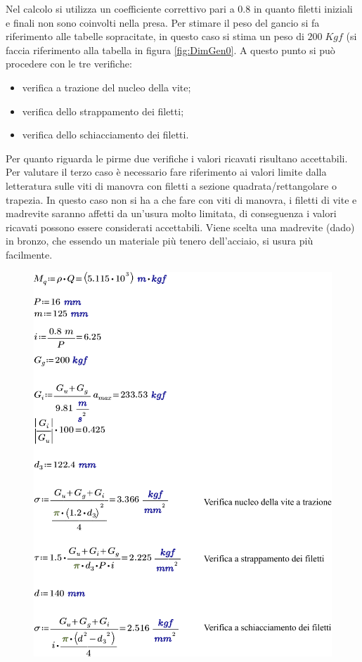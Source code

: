 Nel calcolo si utilizza un coefficiente correttivo pari a $0.8$ in quanto filetti iniziali e finali non sono coinvolti nella presa. 
Per stimare il peso del gancio si fa riferimento alle tabelle sopracitate, in questo caso si stima un peso di $200\; Kgf$ (si faccia riferimento alla tabella in figura \ref{fig:DimGen0}. 
A questo punto si può procedere con le tre verifiche:
\begin{itemize}
\item verifica a trazione del nucleo della vite;
\item verifica dello strappamento dei filetti;
\item verifica dello schiacciamento dei filetti.
\end{itemize}
Per quanto riguarda le pirme due verifiche i valori ricavati risultano accettabili.
Per valutare il terzo caso è necessario fare riferimento ai valori limite dalla letteratura sulle viti di manovra con filetti a sezione quadrata/rettangolare o trapezia. 
In questo caso non si ha a che fare con viti di manovra, i filetti di vite e madrevite saranno affetti da un'usura molto limitata, di conseguenza i valori ricavati possono essere considerati accettabili.
Viene scelta una madrevite (dado) in bronzo, che essendo un materiale più tenero dell'acciaio, si usura più facilmente. 
\begin{figure}[H]
\centering
  \includegraphics[width=.6\textwidth]{imgs/Mathcad7}
\caption{}
\label{fig:Mathcad7}
\end{figure}

